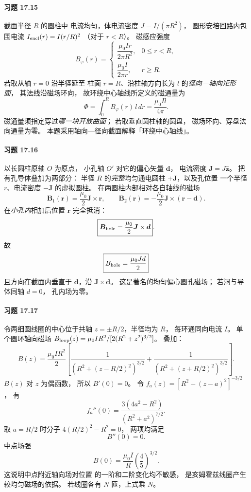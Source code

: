 \paragraph{习题 17.15}
截面半径 \(R\) 的圆柱中
电流均匀，体电流密度
\(J=I/(\pi R^2)\)，
圆形安培回路内包围电流
\(I_{\rm encl}(r)=I(r/R)^2\)
（对于 \(r<R\)）。
磁感应强度
\[
 \boxed{B_\varphi(r)=
 \begin{cases}
 \dfrac{\mu_0Ir}{2\pi R^2},&0\le r<R,\\
 \dfrac{\mu_0I}{2\pi r},&r\ge R.
 \end{cases}}
\]
若取从轴 \(r=0\) 沿半径延至
柱面 \(r=R\)、沿柱轴方向长为 \(l\)
的\emph{径向—轴向矩形面}，
其法线沿磁场环向，
故环绕中心轴线所定义的磁通量为
\[
 \boxed{\Phi=\int_0^R
 B_\varphi(r)\,l\,dr
 =\frac{\mu_0Il}{4\pi}}.
\]
磁通量须指定穿过\emph{哪一块开放曲面}；
若取垂直圆柱轴的圆盘，
磁场环向、穿盘法向通量为零。
本题采用轴向—径向截面解释「环绕中心轴线」。

\paragraph{习题 17.16}
以长圆柱原轴 \(O\) 为原点，
小孔轴 \(O'\) 对它的偏心矢量
\(\boldsymbol d\)，
电流密度
\(\boldsymbol J=J\hat{\boldsymbol z}\)。
把有孔导体叠加为两部分：
半径 \(R\) 的\emph{完整}均匀通电圆柱
\(+\boldsymbol J\)，以及孔位置
一个半径 \(r\)、电流密度
\(-\boldsymbol J\) 的虚拟圆柱。
在两圆柱内部相对各自轴线的磁场
\[
 \boldsymbol B_1(\boldsymbol r)=
 \frac{\mu_0}{2}\boldsymbol J\times\boldsymbol r,
\qquad
 \boldsymbol B_2(\boldsymbol r)=
 -\frac{\mu_0}{2}\boldsymbol J\times
 (\boldsymbol r-\boldsymbol d).
\]
在\emph{小孔内}相加后位置
\(\boldsymbol r\) 完全抵消：
\[
 \boxed{\boldsymbol B_{\rm hole}
 =\frac{\mu_0}{2}\boldsymbol J\times\boldsymbol d}.
\]
故
\[
 \boxed{B_{\rm hole}=\frac{\mu_0Jd}{2}}
\]
且方向在截面内垂直于
\(\boldsymbol d\)，沿
\(\boldsymbol J\times\boldsymbol d\)。
这是著名的均匀偏心圆孔磁场；
若洞与导体同轴 \(d=0\)，
孔内场为零。

\paragraph{习题 17.17}
令两细圆线圈的中心位于共轴
\(z=\pm R/2\)，半径均为 \(R\)，
每环通同向电流 \(I\)。
单个圆环轴向磁场
\(B_{\rm loop}(z)=
 \mu_0IR^2/[2(R^2+z^2)^{3/2}]\)。
叠加：
\[
 \boxed{B(z)=\frac{\mu_0IR^2}{2}
 \left[
 \frac1{(R^2+(z-R/2)^2)^{3/2}}
 +\frac1{(R^2+(z+R/2)^2)^{3/2}}
 \right]}.
\]
\(B(z)\) 对 \(z\) 为偶函数，
所以
\(\boxed{B'(0)=0}\)。
令
\(f_a(z)=[R^2+(z-a)^2]^{-3/2}\)，
有
\[
 f_a''(0)=
 \frac{3(4a^2-R^2)}
 {(R^2+a^2)^{7/2}}.
\]
取 \(a=R/2\) 时分子
\(4(R/2)^2-R^2=0\)，
两项均满足
\[
 \boxed{B''(0)=0}.
\]
中点场强
\[
 \boxed{B(0)=\frac{\mu_0I}{R}
 \left(\frac45\right)^{3/2}}.
\]
这说明中点附近轴向场对位置
的一阶和二阶变化均不敏感，
是亥姆霍兹线圈产生较均匀磁场的依据。
若线圈各有 \(N\) 匝，上式乘 \(N\)。

